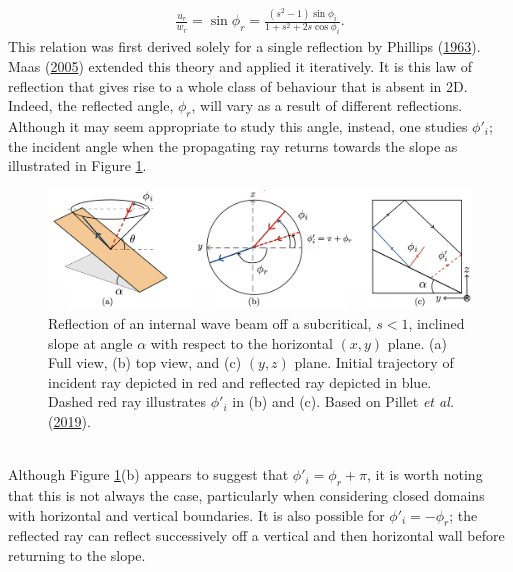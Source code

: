 \documentclass[a4paper]{article}
\numberwithin{equation}{section}
\begin{document}
\begin{align}\label{eq:7.3}
\frac{u_r}{w_r} = \sin \phi_r = \frac{(s^2 - 1)\sin\phi_i}{1 + s^2 + 2s\cos \phi_i}.
\end{align}
This relation was first derived solely for a single reflection by Phillips (\hyperlink{ref 38}{1963}). Maas (\hyperlink{ref 39}{2005}) extended this theory and applied it iteratively. It is this law of reflection that gives rise to a whole class of behaviour that is absent in 2D. Indeed, the reflected angle, $\phi_r$, will vary as a result of different reflections. Although it may seem appropriate to study this angle, instead, one studies $\phi'_i$; the incident angle when the propagating ray returns towards the slope as illustrated in Figure \ref{fig:15}. 
\begin{figure}[h!]
  \includegraphics[scale=0.185, center]{Images/3 diag}
  \caption{Reflection of an internal wave beam off a subcritical, $s < 1$, inclined slope at angle $\alpha$ with respect to the horizontal $(x,y)$ plane. (a) Full view, (b) top view, and (c) $(y, z)$ plane. Initial trajectory of incident ray depicted in red and reflected ray depicted in blue. Dashed red ray illustrates $\phi'_i$ in (b) and (c). Based on Pillet \emph{et al.} (\protect\hyperlink{ref 37}{2019}).}
  \label{fig:15}
\end{figure} \\
Although Figure \ref{fig:15}(b) appears to suggest that $\phi'_i = \phi_r + \pi$, it is worth noting that this is not always the case, particularly when considering closed domains with horizontal and vertical boundaries. It is also possible for $\phi'_i = -\phi_r$; the reflected ray can reflect successively off a vertical and then horizontal wall before returning to the slope.
\end{document}
